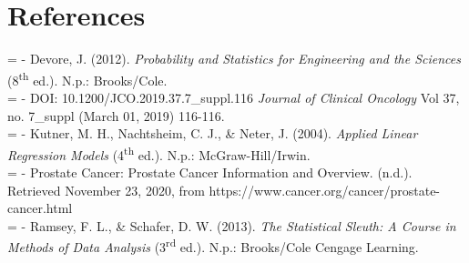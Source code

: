 %
%

\section{References}
\hangindent=\parindent
{}
\noindent
- Devore, J. (2012). \textit{Probability and Statistics for Engineering and the Sciences} (8\textsuperscript{th} ed.). N.p.: Brooks/Cole. \\

\hangindent=\parindent
{}
\noindent
- DOI: 10.1200/JCO.2019.37.7\_suppl.116 \textit{Journal of Clinical Oncology} Vol 37, no. 7\_suppl (March 01, 2019) 116-116. \\

\hangindent=\parindent
{}
\noindent
- Kutner, M. H., Nachtsheim, C. J., \& Neter, J. (2004). \textit{Applied Linear Regression Models} (4\textsuperscript{th} ed.). N.p.: McGraw-Hill/Irwin. \\

\hangindent=\parindent
{}
\noindent
- Prostate Cancer: Prostate Cancer Information and Overview. (n.d.). Retrieved November 23, 2020, from https://www.cancer.org/cancer/prostate-cancer.html \\

\hangindent=\parindent
{}
\noindent
- Ramsey, F. L., \& Schafer, D. W. (2013). \textit{The Statistical Sleuth: A Course in Methods of Data Analysis} (3\textsuperscript{rd} ed.). N.p.: Brooks/Cole Cengage Learning. \\




